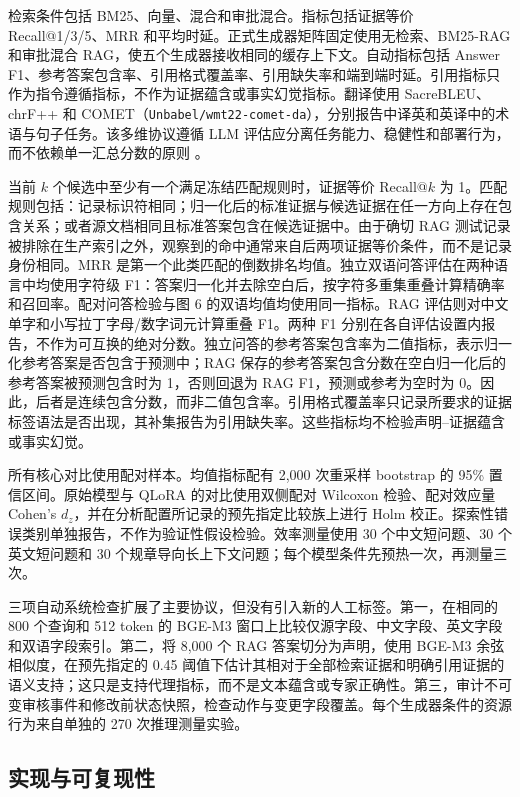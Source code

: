 检索条件包括 BM25、向量、混合和审批混合。指标包括证据等价 Recall@1/3/5、MRR 和平均时延。正式生成器矩阵固定使用无检索、BM25-RAG 和审批混合 RAG，使五个生成器接收相同的缓存上下文。自动指标包括 Answer F1、参考答案包含率、引用格式覆盖率、引用缺失率和端到端时延。引用指标只作为指令遵循指标，不作为证据蕴含或事实幻觉指标。翻译使用 SacreBLEU、chrF++ 和 COMET（\texttt{Unbabel/wmt22-comet-da}），分别报告中译英和英译中的术语与句子任务。该多维协议遵循 LLM 评估应分离任务能力、稳健性和部署行为，而不依赖单一汇总分数的原则 \citep{chang2024survey}。

当前 $k$ 个候选中至少有一个满足冻结匹配规则时，证据等价 Recall@$k$ 为 1。匹配规则包括：记录标识符相同；归一化后的标准证据与候选证据在任一方向上存在包含关系；或者源文档相同且标准答案包含在候选证据中。由于确切 RAG 测试记录被排除在生产索引之外，观察到的命中通常来自后两项证据等价条件，而不是记录身份相同。MRR 是第一个此类匹配的倒数排名均值。独立双语问答评估在两种语言中均使用字符级 F1：答案归一化并去除空白后，按字符多重集重叠计算精确率和召回率。配对问答检验与图 6 的双语均值均使用同一指标。RAG 评估则对中文单字和小写拉丁字母/数字词元计算重叠 F1。两种 F1 分别在各自评估设置内报告，不作为可互换的绝对分数。独立问答的参考答案包含率为二值指标，表示归一化参考答案是否包含于预测中；RAG 保存的参考答案包含分数在空白归一化后的参考答案被预测包含时为 1，否则回退为 RAG F1，预测或参考为空时为 0。因此，后者是连续包含分数，而非二值包含率。引用格式覆盖率只记录所要求的证据标签语法是否出现，其补集报告为引用缺失率。这些指标均不检验声明--证据蕴含或事实幻觉。

所有核心对比使用配对样本。均值指标配有 2,000 次重采样 bootstrap 的 95\% 置信区间。原始模型与 QLoRA 的对比使用双侧配对 Wilcoxon 检验、配对效应量 Cohen's $d_z$，并在分析配置所记录的预先指定比较族上进行 Holm 校正。探索性错误类别单独报告，不作为验证性假设检验。效率测量使用 30 个中文短问题、30 个英文短问题和 30 个规章导向长上下文问题；每个模型条件先预热一次，再测量三次。

三项自动系统检查扩展了主要协议，但没有引入新的人工标签。第一，在相同的 800 个查询和 512 token 的 BGE-M3 窗口上比较仅源字段、中文字段、英文字段和双语字段索引。第二，将 8,000 个 RAG 答案切分为声明，使用 BGE-M3 余弦相似度，在预先指定的 0.45 阈值下估计其相对于全部检索证据和明确引用证据的语义支持；这只是支持代理指标，而不是文本蕴含或专家正确性。第三，审计不可变审核事件和修改前状态快照，检查动作与变更字段覆盖。每个生成器条件的资源行为来自单独的 270 次推理测量实验。

\subsection{实现与可复现性}

